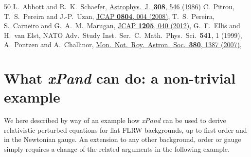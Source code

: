 \documentclass[notitlepage,onecolumn,floatfix,preprintnumbers,aps,prd,showpacs,nofootinbib,amsmath,amssymb,amsfonts]{revtex4-1}
\newcommand{\<}{\langle}
\renewcommand{\>}{\rangle}
\newcounter{inout}
\newcommand{\xPand}{{\em \lowercase{x}P\lowercase{and}}}
\begin{document}
\begin{thebibliography}{50}
%
	L.\ Abbott and R.\ K.\ Schaefer, 
	\href{\doibase 10.1086/164525}{Astrophys.\ J.\ \textbf{308}, 546 (1986)}
%
	C.\ Pitrou, T.\ S.\ Pereira and J.-P.\ Uzan, 
	\href{\doibase 10.1088/1475-7516/2008/04/004}{JCAP \textbf{0804}, 004 (2008)}, 
%
	T.\ S.\ Pereira, S.\ Carneiro and G.\ A.\ M.\ Marugan, 
	\href{\doibase 10.1088/1475-7516/2012/05/040}{JCAP \textbf{1205}, 040 (2012)}, 
%
	G.\ F.\ Ellis and H.\ van Elst, 
	NATO Adv.\ Study Inst.\ Ser.\ C.\ Math.\ Phys.\ Sci.\ \textbf{541}, 1 (1999), 
%
	A.\ Pontzen and A.\ Challinor, 
	\href{\doibase 10.1111/j.1365-2966.2007.12221.x}{Mon.\ Not.\ Roy.\ Astron.\ Soc.\ \textbf{380}, 1387 (2007)}, 
\end{thebibliography}%


\appendix

\setcounter{inout}{0}

\section{What {\xPand} can do: a non-trivial example} \label{app:non-trivial}

We here described by way of an example how \textit{xPand} can be used to derive 
relativistic perturbed equations for flat FLRW backgrounds, up to first order and in 
the Newtonian gauge. An extension to any other background, order or gauge simply 
requires a change of the related arguments in the following example. 
\end{document}
